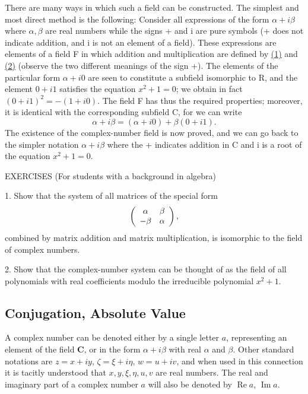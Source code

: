 There are many ways in which such a field can be constructed. The simplest and most direct method is the following: Consider all expressions of the form $\alpha + i\beta$ where $\alpha, \beta$ are real numbers while the signs + and i are pure symbols (+ does not indicate addition, and i is not an element of a field). These expressions are elements of a field F in which addition and multiplication are defined by \hyperref[eq:1.1]{(1)} and \hyperref[eq:1.2]{(2)} (observe the two different meanings of the sign +). The elements of the particular form $\alpha + i0$ are seen to constitute a subfield isomorphic to R, and the element $0 + i1$ satisfies the equation $x^{2} + 1 = 0$; we obtain in fact $(0 + i1)^{2} = -(1 + i0)$. The field F has thus the required properties; moreover, it is identical with the corresponding subfield C, for we can write
\begin{equation*}
\alpha + i \beta = (\alpha + i 0) + \beta (0 + i 1).
\end{equation*}
The existence of the complex-number field is now proved, and we can go back to the simpler notation $\alpha + i\beta$ where the + indicates addition in C and i is a root of the equation $x^{2} + 1 = 0$.

EXERCISES (For students with a background in algebra)

1. Show that the system of all matrices of the special form
\begin{equation*}
\left( \begin{array}{c c} \alpha & \beta \\ - \beta & \alpha \end{array} \right),
\end{equation*}
combined by matrix addition and matrix multiplication, is isomorphic to the field of complex numbers.

2. Show that the complex-number system can be thought of as the field of all polynomials with real coefficients modulo the irreducible polynomial $x^{2} + 1$.

\setcounter{section}{1}\setcounter{subsection}{3}\subsection{Conjugation, Absolute Value}\label{sec:1.1.4}
A complex number can be denoted either by a single letter $a$, representing an element of the field $\mathbf{C}$, or in the form $\alpha + i\beta$ with real $\alpha$ and $\beta$. Other standard notations are $z = x + iy$, $\zeta = \xi + i\eta$, $w = u + iv$, and when used in this connection it
is tacitly understood that $x, y, \xi, \eta, u, v$ are real numbers. The real and imaginary part of a complex number $a$ will also be denoted by $\operatorname{Re} a$, $\operatorname{Im} a$.

